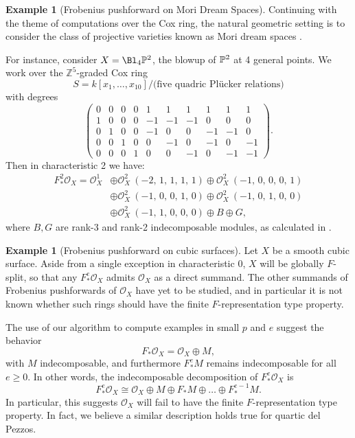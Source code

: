 \documentclass[12pt]{article}
\def\OO{\mathcal O}
\def\ZZ{\mathbb Z}
\theoremstyle{theorem}
\numberwithin{thm}{section}
\theoremstyle{definition}
\newtheorem{exa}[thm]{Example}
\begin{document}
\begin{exa}[Frobenius pushforward on Mori Dream Spaces]
  Continuing with the theme of computations over the Cox ring, the natural geometric setting is to consider the class of projective varieties known as Mori dream spaces \cite{HK00}.

  For instance, consider $X = \Bl_4\P^2$, the blowup of $\P^2$ at 4 general points. We work over the $\ZZ^5$-graded Cox ring
  \[ S = k[x_1,\dots,x_{10}]/\text{(five quadric Pl\"ucker relations)} \]
  with degrees
  \[
  \left(\!\begin{array}{rrrrrrrrrr}
  0&0&0&0&1&1&1&1&1&1 \\
  1&0&0&0&-1&-1&-1&0&0&0 \\
  0&1&0&0&-1&0&0&-1&-1&0 \\
  0&0&1&0&0&-1&0&-1&0&-1 \\
  0&0&0&1&0&0&-1&0&-1&-1
  \end{array}\!\right).
  \]
  Then in characteristic 2 we have:
  \begin{align*}
    F_*^2\OO_X = {\OO_{X}^{1}}
    &\oplus {\OO_{X}^{2}\ \left(-2,\,1,\,1,\,1,\,1\right)} \oplus {\OO_{X}^{2}\ \left(-1,\,0,\,0,\,0,\,1\right)} \\
    &\oplus {\OO_{X}^{2}\ \left(-1,\,0,\,0,\,1,\,0\right)} \oplus {\OO_{X}^{2}\ \left(-1,\,0,\,1,\,0,\,0\right)} \\
    &\oplus {\OO_{X}^{2}\ \left(-1,\,1,\,0,\,0,\,0\right)} \oplus B \oplus G,
  \end{align*}
  where $B, G$ are rank-3 and rank-2 indecomposable modules, as calculated in \cite{Hara15}.
\end{exa}

\begin{exa}[Frobenius pushforward on cubic surfaces]
  Let $X$ be a smooth cubic surface. Aside from a single exception in characteristic 0, $X$ will be globally $F$-split, so that any $F^e_*\OO_X $ admits $\OO_X$ as a direct summand.
  The other summands of Frobenius pushforwards of $\OO_X$ have yet to be studied, and in particular it is not known whether such rings should have the finite $F$-representation type property.

  The use of our algorithm to compute examples in small $p$ and $e$ suggest the behavior
  $$ F_* \OO_X = \OO_X\oplus M, $$
  with $M$ indecomposable, and furthermore $F_*^e M$ remains indecomposable for all $e\geq 0$. In other words, the indecomposable decomposition of $F^e_* \OO_X$ is
  $$ F_*^e \OO_X \cong \OO_X\oplus M\oplus F_* M\oplus\dots\oplus F_*^{e-1}M. $$
  In particular, this suggests $\OO_X$ will fail to have the finite $F$-representation type property.
  In fact, we believe a similar description holds true for quartic del Pezzos.
\end{exa}
\end{document}
